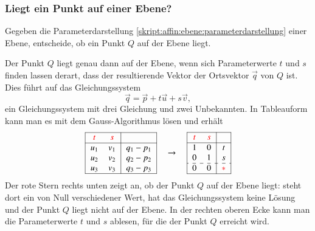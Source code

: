 \subsubsection{Liegt ein Punkt auf einer Ebene?}
\begin{aufgabe}
Gegeben die Parameterdarstellung
\eqref{skript:affin:ebene:parameterdarstellung}
einer Ebene, entscheide, ob ein Punkt $Q$ auf der Ebene liegt.
\end{aufgabe}
Der Punkt $Q$ liegt genau dann auf der Ebene, wenn sich Parameterwerte
$t$ und $s$ finden lassen derart, dass der resultierende Vektor
der Ortsvektor $\vec{q}$ von $Q$ ist.
Dies führt auf das Gleichungssystem
\[
\vec{q}
=
\vec{p} + t\vec{u} + s\vec{v},
\]
ein Gleichungssystem mit drei Gleichung und zwei Unbekannten.
In Tableauform kann man es mit dem Gauss-Algorithmus lösen und
erhält
\[
\begin{tabular}{|>{$}c<{$}>{$}c<{$}|>{$}c<{$}|}
\hline
\color{red}t&\color{red}s&\\
\hline
u_1&v_1&q_1-p_1\\
u_2&v_2&q_2-p_2\\
u_3&v_3&q_3-p_3\\
\hline
\end{tabular}
\quad\rightarrow\quad
\begin{tabular}{|>{$}c<{$}>{$}c<{$}|>{$}c<{$}|}
\hline
\color{red}t&\color{red}s&\\
\hline
1&0&t\\
0&1&s\\
\hdashline
0&0&\color{red}*\\
\hline
\end{tabular}
\]
Der rote Stern rechts unten zeigt an, ob der Punkt $Q$ auf der Ebene liegt:
steht dort ein von Null verschiedener Wert, hat das Gleichungssystem keine
Lösung und der Punkt $Q$ liegt nicht auf der Ebene.
In der rechten oberen Ecke kann man die Parameterwerte $t$ und $s$
ablesen, für die der Punkt $Q$ erreicht wird.

